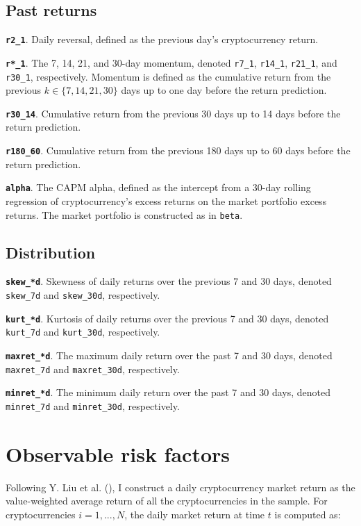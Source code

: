 \documentclass[
  12pt,
  a4paper,
  openany]{scrbook}
\begin{document}
\subsection{Past returns}\label{past-returns}

\textbf{\texttt{r2\_1}}. Daily reversal, defined as the previous day's
cryptocurrency return.

\textbf{\texttt{r*\_1}}. The 7, 14, 21, and 30-day momentum, denoted
\texttt{r7\_1}, \texttt{r14\_1}, \texttt{r21\_1}, and \texttt{r30\_1},
respectively. Momentum is defined as the cumulative return from the
previous \(k \in \{7, 14, 21, 30\}\) days up to one day before the
return prediction.

\textbf{\texttt{r30\_14}}. Cumulative return from the previous 30 days
up to 14 days before the return prediction.

\textbf{\texttt{r180\_60}}. Cumulative return from the previous 180 days
up to 60 days before the return prediction.

\textbf{\texttt{alpha}}. The CAPM alpha, defined as the intercept from a
30-day rolling regression of cryptocurrency's excess returns on the
market portfolio excess returns. The market portfolio is constructed as
in \texttt{beta}.

\subsection{Distribution}\label{distribution}

\textbf{\texttt{skew\_*d}}. Skewness of daily returns over the previous
7 and 30 days, denoted \texttt{skew\_7d} and \texttt{skew\_30d},
respectively.

\textbf{\texttt{kurt\_*d}}. Kurtosis of daily returns over the previous
7 and 30 days, denoted \texttt{kurt\_7d} and \texttt{kurt\_30d},
respectively.

\textbf{\texttt{maxret\_*d}}. The maximum daily return over the past 7
and 30 days, denoted \texttt{maxret\_7d} and \texttt{maxret\_30d},
respectively.

\textbf{\texttt{minret\_*d}}. The minimum daily return over the past 7
and 30 days, denoted \texttt{minret\_7d} and \texttt{minret\_30d},
respectively.

\section{Observable risk factors}\label{sec-obs_factors}

Following Y. Liu et al. (), I
construct a daily cryptocurrency market return as the value-weighted
average return of all the cryptocurrencies in the sample. For
cryptocurrencies \(i = 1, ..., N\), the daily market return at time
\(t\) is computed as:
\end{document}
